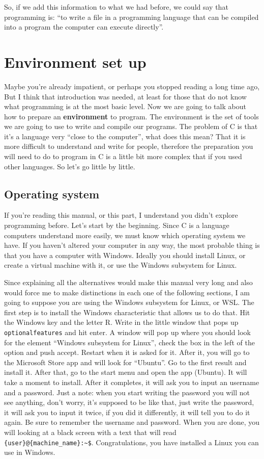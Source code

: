 \documentclass[a4paper]{article}
\begin{document}
So, if we add this information to what we had before, we could say that
programming is: ``to write a file in a programming language that can be
compiled into a program the computer can execute directly''.

\section{Environment set up}
Maybe you're already impatient, or perhaps you stopped reading a long time
ago, But I think that introduction was needed, at least for those that do not
know what programming is at the most basic level. Now we are going to talk about
how to prepare an \textbf{environment} to program. The environment is the set of
tools we are going to use to write and compile our programs.
The problem of C is that it's a language very ``close to the computer'', what
does this mean? That it is more difficult to understand and write for people,
therefore the preparation you will need to do to program in C is a little bit
more complex that if you used other languages. So let's go little by little.

\subsection{Operating system}
If you're reading this manual, or this part, I understand you didn't explore
programming before. Let's start by the beginning. Since C is a language
computers understand more easily, we must know which operating system we have.
If you haven't altered your computer in any way, the most probable thing is
that you have a computer with Windows. Ideally you should install Linux, or
create a virtual machine with it, or use the Windows subsystem for
Linux.

Since explaining all the alternatives would make this manual very long and also
would force me to make distinctions in each one of the following sections, I am
going to suppose you are using the Windows subsystem for Linux, or WSL. The
first step is to install the Windows characteristic that allows us to
do that. Hit the Windows key and the letter R. Write in the little window that
pops up \verb!optionalfeatures! and hit enter. A window will pop up
where you should look for the element ``Windows subsystem for Linux'', check the
box in the left of the option and push accept. Restart when it is asked for it.
After it, you will go to the Microsoft Store app and will look for ``Ubuntu''.
Go to the first result and install it. After that, go to the start menu and
open the app (Ubuntu). It will take a moment to install. After it completes,
it will ask you to input an username and a password. Just a note: when you start
writing the password you will not see anything, don't worry, it's supposed to
be like that, just write the password, it will ask you to input it twice, if
you did it differently, it will tell you to do it again. Be sure to remember
the username and password. When you are done, you will looking at a black screen
with a text that will read \verb!{user}@{machine_name}:~$!. Congratulations,
you have installed a Linux you can use in Windows.
\end{document}
